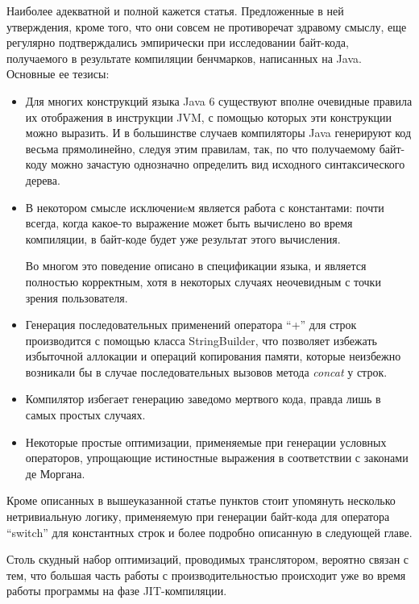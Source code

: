 Наиболее адекватной и полной кажется статья\cite{JavacOT}.
Предложенные в ней утверждения, кроме того, что они совсем не противоречат здравому смыслу,
еще регулярно подтверждались эмпирически при исследовании байт-кода, получаемого в результате
компиляции бенчмарков, написанных на Java. %
Основные ее тезисы:
\begin{itemize}
    \item Для многих конструкций языка Java 6 существуют вполне очевидные правила их отображения
    в инструкции JVM, с помощью которых эти конструкции можно выразить.
    И в большинстве случаев компиляторы Java генерируют код весьма прямолинейно, следуя этим
    правилам, так, по что получаемому байт-коду можно зачастую однозначно определить вид исходного
    синтаксического дерева.
    \item В некотором смысле исключениeм является работа с константами:
    почти всегда, когда какое-то выражение может быть вычислено во время компиляции, в байт-коде
    будет уже результат этого вычисления.

    Во многом это поведение описано в спецификации языка, и является полностью корректным,
    хотя в некоторых случаях неочевидным с точки зрения пользователя.

    \item Генерация последовательных применений оператора ``+'' для строк производится с помощью
    класса StringBuilder, что позволяет избежать избыточной аллокации и операций копирования памяти,
    которые неизбежно возникали бы в случае последовательных вызовов метода \textit{concat} у строк.

    \item Компилятор избегает генерацию заведомо мертвого кода, правда лишь в самых простых случаях.

    \item Некоторые простые оптимизации, применяемые при генерации условных операторов, упрощающие
    истиностные выражения в соответствии с законами де Моргана.
\end{itemize}

Кроме описанных в вышеуказанной статье пунктов стоит упомянуть несколько нетривиальную логику,
применяемую при генерации байт-кода для оператора ``switch'' для константных строк и более подробно
описанную в следующей главе. %

Столь скудный набор оптимизаций, проводимых транслятором, вероятно связан с тем, что большая часть
работы с производительностью происходит уже во время работы программы на фазе JIT-компиляции.

